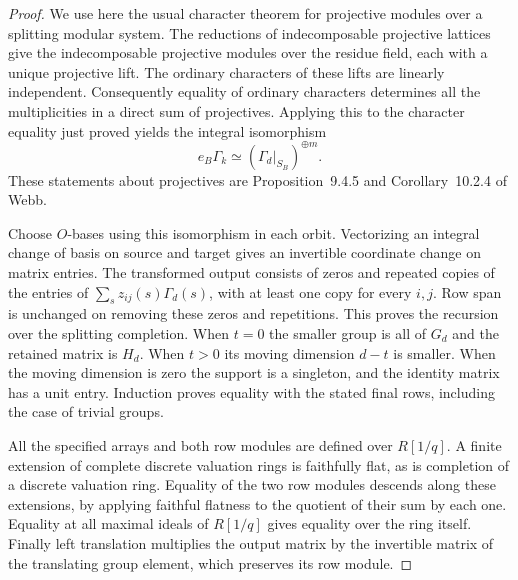 \documentclass[a4paper,11pt]{article}
\theoremstyle{definition}
\theoremstyle{remark}
\numberwithin{equation}{section}
\begin{document}
\begin{proof}
We use here the usual character theorem for projective modules
over a splitting modular system. The reductions of indecomposable
projective lattices give the indecomposable projective modules
over the residue field, each with a unique projective lift.
The ordinary characters of these lifts are linearly independent.
Consequently equality of ordinary characters determines all the
multiplicities in a direct sum of projectives. Applying this to
the character equality just proved yields the integral isomorphism
\[
           e_B\Gamma_k \simeq
                (\Gamma_d|_{S_B})^{\oplus m}.
\]
These statements about projectives are Proposition~9.4.5 and
Corollary~10.2.4 of Webb.~\cite{XVIII-XIII-projectivecharacters627}

Choose \(O\)-bases using this isomorphism in each orbit.
Vectorizing an integral change of basis on source and target
gives an invertible coordinate change on matrix entries.
The transformed output consists of zeros and repeated copies
of the entries of \(\sum_s z_{ij}(s)\Gamma_d(s)\), with at least
one copy for every \(i,j\). Row span is unchanged on removing
these zeros and repetitions. This proves the recursion over the
splitting completion. When \(t=0\) the smaller group is all of
\(G_d\) and the retained matrix is \(H_d\). When \(t>0\) its
moving dimension \(d-t\) is smaller. When the moving dimension
is zero the support is a singleton, and the identity matrix has
a unit entry. Induction proves equality with the stated final
rows, including the case of trivial groups.

All the specified arrays and both row modules are defined over
\(R[1/q]\). A finite extension of complete discrete valuation
rings is faithfully flat, as is completion of a discrete
valuation ring. Equality of the two row modules descends along
these extensions, by applying faithful flatness to the quotient
of their sum by each one. Equality at all maximal ideals of
\(R[1/q]\) gives equality over the ring itself. Finally left
translation multiplies the output matrix by the invertible
matrix of the translating group element, which preserves its
row module.
\end{proof}
\end{document}
